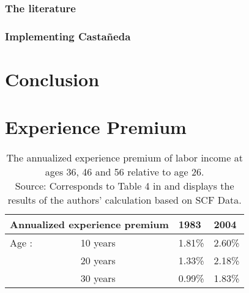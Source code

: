 \documentclass[a4paper,12pt]{article}
\begin{document}
\subsubsection{The literature}
\subsubsection{Implementing Casta\~{n}eda}
\section{Conclusion}
\label{Chapter6}


\newpage





\newpage


\appendix
\section{Experience Premium}
 \label{table_experience_premium}  


\begin{table}[!htbp]
\centering
\begin{threeparttable}
\setlength{\tabcolsep}{3em}
\caption[The annualized experience premium of labor income at ages 36, 46 and 56 relative to age 26.Source: Corresponds to Table 4 in \cite{hintermaier2011} and is based on the authors' calculation based on SCF Data.]{The annualized experience premium of labor income at ages 36, 46 and 56 relative to age 26.\\\hspace{\textwidth} Source: Corresponds to Table 4 in \cite{hintermaier2011} and displays the results of the authors' calculation based on SCF Data.}
\label{my-label}
\begin{tabular}{@{}llll@{}}
\toprule
\multicolumn{2}{l}{Annualized experience premium} & 1983   & 2004   \\ \midrule
Age \textendash  26:& 10 years               & 1.81\% & 2.60\% \\
                         & 20 years               & 1.33\% & 2.18\% \\
                         & 30 years               & 0.99\% & 1.83\% \\ \bottomrule
\end{tabular}
\end{threeparttable}
\end{table}
\end{document}
